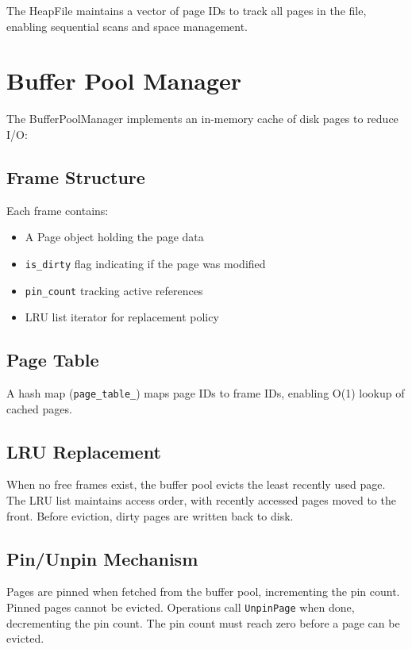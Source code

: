 \documentclass{article}
\begin{document}
The HeapFile maintains a vector of page IDs to track all pages in the file, enabling sequential scans and space management.

\section{Buffer Pool Manager}

The BufferPoolManager implements an in-memory cache of disk pages to reduce I/O:

\subsection{Frame Structure}

Each frame contains:
\begin{itemize}
    \item A Page object holding the page data
    \item \texttt{is\_dirty} flag indicating if the page was modified
    \item \texttt{pin\_count} tracking active references
    \item LRU list iterator for replacement policy
\end{itemize}

\subsection{Page Table}

A hash map (\texttt{page\_table\_}) maps page IDs to frame IDs, enabling O(1) lookup of cached pages.

\subsection{LRU Replacement}

When no free frames exist, the buffer pool evicts the least recently used page. The LRU list maintains access order, with recently accessed pages moved to the front. Before eviction, dirty pages are written back to disk.

\subsection{Pin/Unpin Mechanism}

Pages are pinned when fetched from the buffer pool, incrementing the pin count. Pinned pages cannot be evicted. Operations call \texttt{UnpinPage} when done, decrementing the pin count. The pin count must reach zero before a page can be evicted.
\end{document}
